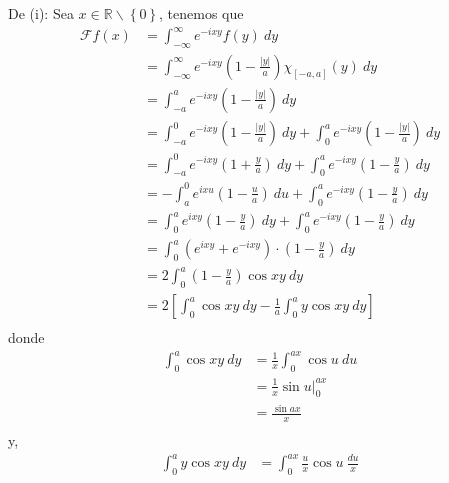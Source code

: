 \documentclass[12pt]{report}
\newcounter{it}
\theoremstyle{largebreak}
\newcommand\abs[1]{\ensuremath{\left|#1\right|}}
\newcommand{\fou}[1]{\ensuremath{\mathcal{F}#1}}
\begin{document}
    \begin{sol}
        De (i): Sea $x\in\mathbb{R}\backslash\left\{0\right\}$, tenemos que
        \begin{equation*}
            \begin{split}
                \fou{f}(x)&=\int_{-\infty}^\infty e^{ -ixy}f(y)\:dy\\
                &=\int_{-\infty}^\infty e^{ -ixy}\left(1-\frac{\abs{y}}{a} \right)\chi_{[-a,a]}(y)\:dy\\
                &=\int_{-a}^a e^{ -ixy}\left(1-\frac{\abs{y}}{a}\right)\:dy\\
                &=\int_{-a}^0 e^{ -ixy}\left(1-\frac{\abs{y}}{a}\right)\:dy+\int_{0}^a e^{ -ixy}\left(1-\frac{\abs{y}}{a}\right)\:dy\\
                &=\int_{-a}^0 e^{ -ixy}\left(1+\frac{y}{a}\right)\:dy+\int_{0}^a e^{ -ixy}\left(1-\frac{y}{a}\right)\:dy\\
                &=-\int_{a}^0 e^{ ixu}\left(1-\frac{u}{a}\right)\:du+\int_{0}^a e^{ -ixy}\left(1-\frac{y}{a}\right)\:dy\\
                &=\int_{0}^a e^{ ixy}\left(1-\frac{y}{a}\right)\:dy+\int_{0}^a e^{ -ixy}\left(1-\frac{y}{a}\right)\:dy\\
                &=\int_{0}^a\left(e^{ ixy}+e^{-ixy}\right)\cdot\left(1-\frac{y}{a}\right)\:dy\\
                &=2\int_{0}^a\left(1-\frac{y}{a}\right)\cos xy\:dy\\
                &=2\left[\int_{0}^a\cos xy\:dy-\frac{1}{a}\int_0^a y\cos xy\:dy\right]\\
            \end{split}
        \end{equation*}
        donde
        \begin{equation*}
            \begin{split}
                \int_{0}^a\cos xy\:dy&=\frac{1}{x}\int_0^{ ax}\cos u\:du\\
                &=\frac{1}{x}\sin u\Big|_0^{ax}\\
                &=\frac{\sin ax}{x}\\
            \end{split}
        \end{equation*}
        y,
        \begin{equation*}
            \begin{split}
                \int_0^a y\cos xy\:dy&=\int_0^{ax}\frac{u}{x}\cos u\: \frac{du}{x}\\

\end{split}
\end{equation*}
\end{sol}
\end{document}
